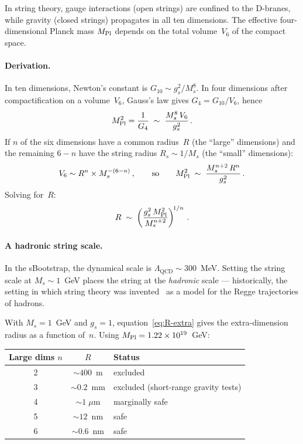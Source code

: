 \documentclass[12pt,a4paper]{article}
\begin{document}
In string theory, gauge interactions (open strings) are confined to
the D-branes, while gravity (closed strings) propagates in all ten
dimensions.  The effective four-dimensional Planck mass $M_{\rm Pl}$
depends on the total volume~$V_6$ of the compact space.

\paragraph{Derivation.}
In ten dimensions, Newton's constant is $G_{10} \sim g_s^2/M_s^8$.
In four dimensions after compactification on a volume~$V_6$,
Gauss's law gives $G_4 = G_{10}/V_6$, hence
\begin{equation}\label{eq:Mpl-Ms}
  M_{\rm Pl}^2 = \frac{1}{G_4}
  \;\sim\;
  \frac{M_s^{8}\,V_6}{g_s^2}\,.
\end{equation}
If $n$ of the six dimensions have a common radius~$R$ (the
``large'' dimensions) and the remaining $6 - n$ have the string
radius $R_s \sim 1/M_s$ (the ``small'' dimensions):
\begin{equation}
  V_6 \sim R^n \times M_s^{-(6-n)}\,,
  \qquad\text{so}\qquad
  M_{\rm Pl}^2 \;\sim\;
  \frac{M_s^{n+2}\,R^n}{g_s^2}\,.
\end{equation}
Solving for~$R$:
\begin{equation}\label{eq:R-extra}
  R \;\sim\;
  \left(\frac{g_s^2\,M_{\rm Pl}^2}{M_s^{n+2}}\right)^{\!1/n}\,.
\end{equation}

\paragraph{A hadronic string scale.}
In the sBootstrap, the dynamical scale is
$\Lambda_{\text{QCD}} \sim 300$~MeV.  Setting the string scale at
$M_s \sim 1$~GeV places the string at the \emph{hadronic} scale ---
historically, the setting in which string theory was
invented~\cite{Veneziano1968, Nambu1970} as a model for the Regge
trajectories of hadrons.

With $M_s = 1$~GeV and $g_s = 1$, equation~\eqref{eq:R-extra}
gives the extra-dimension radius as a function of~$n$.  Using
$M_{\rm Pl} = 1.22 \times 10^{19}$~GeV:
\begin{center}
\begin{tabular}{ccl}
\toprule
Large dims $n$ & $R$ & Status \\
\midrule
2 & $\sim 400$~m & excluded \\
3 & $\sim 0.2$~mm & excluded (short-range gravity tests) \\
4 & $\sim 1\;\mu$m & marginally safe \\
5 & $\sim 12$~nm & safe \\
6 & $\sim 0.6$~nm & safe \\
\bottomrule
\end{tabular}
\end{center}
\end{document}

